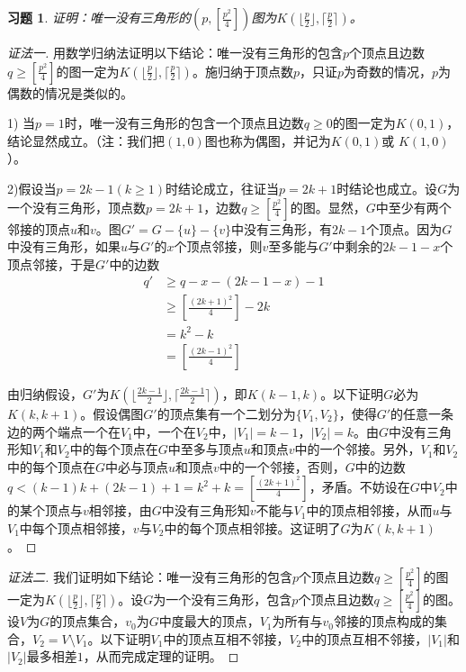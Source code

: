 \documentclass{article}
\begin{document}
\begin{CJK}{UTF8}{gbsn}
\newtheorem*{Ex}{习题}
  \begin{Ex}
      证明：唯一没有三角形的$(p,[\frac{p^2}{4}])$图为$K(\lfloor \frac{p}{2} \rfloor,\lceil \frac{p}{2} \rceil )$。
\end{Ex}
\begin{proof}[证法一]用数学归纳法证明以下结论：唯一没有三角形的包含$p$个顶点且边数$q\geq [\frac{p^2}{4}]$的图一定为$K(\lfloor \frac{p}{2} \rfloor,\lceil \frac{p}{2} \rceil )$。施归纳于顶点数$p$，只证$p$为奇数的情况，$p$为偶数的情况是类似的。

  1) 当$p=1$时，唯一没有三角形的包含一个顶点且边数$q\geq 0$的图一定为$K(0,1)$，结论显然成立。（注：我们把$(1,0)$图也称为偶图，并记为$K(0,1)$或 $K(1,0)$）。

  

  2)假设当$p=2k-1(k\geq 1)$时结论成立，往证当$p=2k+1$时结论也成立。设$G$为一个没有三角形，顶点数$p=2k+1$，边数$q \geq [\frac{p^2}{4}]$的图。显然，$G$中至少有两个邻接的顶点$u$和$v$。图$G'=G-\{u\}-\{v\}$中没有三角形，有$2k-1$个顶点。因为$G$中没有三角形，如果$u$与$G'$的$x$个顶点邻接，则$v$至多能与$G'$中剩余的$2k-1-x$个顶点邻接，于是$G'$中的边数
  \begin{equation*}
    \begin{split}
      q'&\geq q - x - (2k-1-x) - 1\\
      &\geq [\frac{(2k+1)^2}{4}]-2k\\
      &=k^2-k\\
      &=[\frac{(2k-1)^2}{4}]
    \end{split}
  \end{equation*}

  由归纳假设，$G'$为$K(\lfloor \frac{2k-1}{2} \rfloor,\lceil \frac{2k-1}{2} \rceil )$，即$K(k-1,k)$。以下证明$G$必为$K(k,k+1)$。假设偶图$G'$的顶点集有一个二划分为$\{V_1,V_2\}$，使得$G'$的任意一条边的两个端点一个在$V_1$中，一个在$V_2$中，$|V_1|=k-1$，$|V_2|=k$。由$G$中没有三角形知$V_1$和$V_2$中的每个顶点在$G$中至多与顶点$u$和顶点$v$中的一个邻接。另外，$V_1$和$V_2$中的每个顶点在$G$中必与顶点$u$和顶点$v$中的一个邻接，否则，$G$中的边数$q < (k-1)k + (2k-1) + 1 = k^2 + k = [\frac{(2k+1)^2}{4}]$，矛盾。不妨设在$G$中$V_2$中的某个顶点与$v$相邻接，由$G$中没有三角形知$v$不能与$V_1$中的顶点相邻接，从而$u$与$V_1$中每个顶点相邻接，$v$与$V_2$中的每个顶点相邻接。这证明了$G$为$K(k,k+1)$。
  
  
\end{proof}

\begin{proof}[证法二]我们证明如下结论：唯一没有三角形的包含$p$个顶点且边数$q\geq [\frac{p^2}{4}]$的图一定为$K(\lfloor \frac{p}{2} \rfloor,\lceil \frac{p}{2} \rceil )$。设$G$为一个没有三角形，包含$p$个顶点且边数$q\geq [\frac{p^2}{4}]$的图。设$V$为$G$的顶点集合，$v_0$为$G$中度最大的顶点，$V_1$为所有与$v_0$邻接的顶点构成的集合，$V_2=V\setminus V_1$。以下证明$V_1$中的顶点互相不邻接，$V_2$中的顶点互相不邻接，$|V_1|$和$|V_2|$最多相差$1$，从而完成定理的证明。


\end{proof}
\end{CJK}
\end{document}
